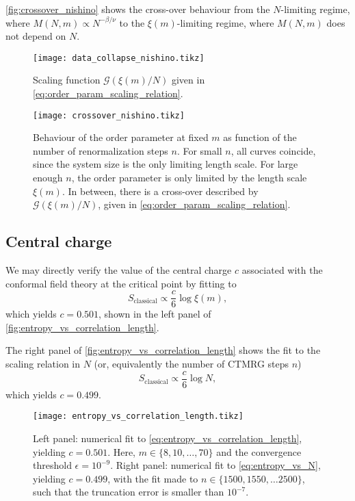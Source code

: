 \autoref{fig:crossover_nishino} shows the cross-over behaviour from the $N$-limiting regime, where
$M(N, m) \propto N^{-\beta/\nu}$ to the $\xi(m)$-limiting regime, where $M(N, m)$ does not depend on $N$.

\begin{figure}
  \texttt{[image: data\_collapse\_nishino.tikz]}
  \caption{Scaling function $\mathcal{G}(\xi(m)/N)$ given in
  \autoref{eq:order_param_scaling_relation}.}\label{fig:data_collapse_nishino}
\end{figure}

\begin{figure}
  \texttt{[image: crossover\_nishino.tikz]}
  \caption{Behaviour of the order parameter at fixed $m$ as function of
  the number of renormalization steps $n$. For small $n$, all curves coincide, since the system size is the only
  limiting length scale. For large enough $n$, the order parameter is only limited by the length scale
  $\xi(m)$. In between, there is a cross-over described by $\mathcal{G}(\xi(m)/N)$, given in
  \autoref{eq:order_param_scaling_relation}.}\label{fig:crossover_nishino}
\end{figure}

\subsection{Central charge}
We may directly verify the value of the central charge $c$ associated with the conformal field theory at the critical
point by fitting to
\begin{equation}\label{eq:entropy_vs_correlation_length}
  S_{\text{classical}} \propto \frac{c}{6} \log \xi(m),
\end{equation}
which yields $c = 0.501$, shown in the left panel of \autoref{fig:entropy_vs_correlation_length}.

The right panel of \autoref{fig:entropy_vs_correlation_length} shows the fit to the scaling relation in $N$ (or,
equivalently the number of CTMRG steps $n$)
\begin{equation}\label{eq:entropy_vs_N}
  S_{\text{classical}} \propto \frac{c}{6} \log N,
\end{equation}
which yields $c = 0.499$.

\begin{figure}
  \texttt{[image: entropy\_vs\_correlation\_length.tikz]}

  \caption{Left panel:
numerical fit to \autoref{eq:entropy_vs_correlation_length}, yielding $c = 0.501$.
Here, $m \in \{ 8, 10, \dots, 70 \}$ and the convergence threshold $\epsilon = 10^{-9}$.
Right panel:
numerical fit to \autoref{eq:entropy_vs_N}, yielding $c = 0.499$,
with the fit made to $n \in \{ 1500, 1550, \dots 2500 \}$, such that the truncation error is smaller than
$10^{-7}$.}
\label{fig:entropy_vs_correlation_length}
\end{figure}

